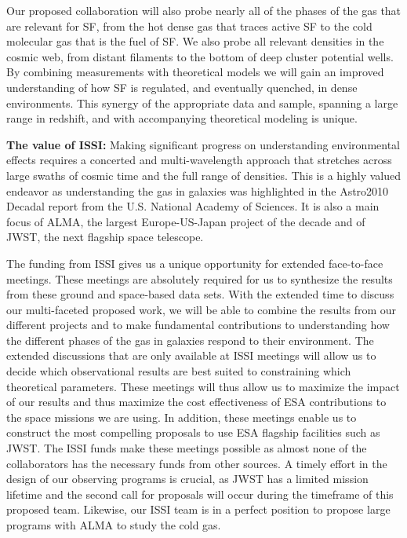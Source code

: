 \documentclass[11pt]{article}
\begin{document}
Our proposed collaboration will also probe nearly all of the phases of
the gas that are relevant for SF, from the hot dense gas
that traces active SF to the cold molecular gas that is
the fuel of SF.  We also probe all relevant densities in the cosmic web, from distant filaments to the bottom of deep cluster potential wells.  By combining  measurements with
theoretical models we will gain an improved understanding of
how SF is regulated, and eventually quenched, in dense
environments.  This synergy of the appropriate data and sample, spanning a large range in redshift, and with
accompanying theoretical modeling is unique.

\textbf{The value of ISSI:}  
Making significant progress on understanding environmental effects requires a concerted and
multi-wavelength approach that stretches across large swaths of cosmic
time and the full range of densities.  This is a highly valued endeavor as understanding the gas in
galaxies was highlighted in the Astro2010 Decadal report from the
U.S. National Academy of Sciences.  It is also a main focus of ALMA,
the largest Europe-US-Japan project of the decade and of JWST, the next flagship space telescope.

The funding from ISSI gives us a unique opportunity for extended face-to-face meetings.  These meetings are absolutely required for us to synthesize the results from these ground and space-based data sets.  With the extended time to discuss our multi-faceted proposed work, we will be able to combine the results from our different projects and to make fundamental contributions to understanding how the different phases of the gas in galaxies respond to their environment.  The extended discussions that are only available at ISSI meetings will allow us to decide which observational results are best suited to constraining which theoretical parameters.  These meetings will thus allow us to maximize the impact of our results and thus maximize the cost effectiveness of ESA contributions to the space missions we are using.  In addition, these meetings enable us to construct the most compelling proposals to use ESA flagship facilities such as JWST.  The ISSI funds make these meetings possible as almost none of the collaborators has the necessary funds from other sources.  A timely effort in the design of our observing programs is crucial, as JWST has a limited mission lifetime and the second call for proposals will occur during the timeframe of this proposed team. Likewise, our ISSI team is in a perfect position to propose large programs with ALMA to study the cold gas.  
\end{document}
